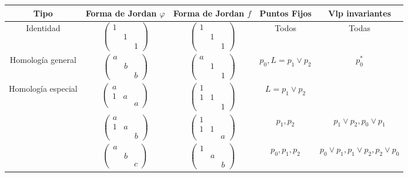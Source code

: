\documentclass[leqno]{article}
\begin{document}
\begin{center}
\begin{tabular}{|c|c|c|c|c|}
\hline
Tipo & Forma de Jordan $\varphi $ & Forma de Jordan $f$ & Puntos Fijos & Vlp invariantes \\
\hline
Identidad & $\begin{pmatrix} 1 & & \\ & 1 & \\ & & 1 \end{pmatrix}$ & $\begin{pmatrix} 1 & & \\ & 1 & \\ & & 1 \end{pmatrix} $ & Todos & Todas \\
	 \hline
Homología general	 & $\begin{pmatrix} a & & \\ & b & \\  & & b \end{pmatrix} $ & $\begin{pmatrix} a & & \\ & 1 & \\  & & 1 \end{pmatrix} $ & $p_0, L = p_1\lor p_2$ & $p_0^*$ \\
	 \hline
Homología especial	 & $\begin{pmatrix} a & & \\ 1 & a & \\  & & a \end{pmatrix} $ & $\begin{pmatrix} 1 & & \\ 1 & 1 & \\  & & 1 \end{pmatrix} $ & $L = p_1\lor p_2$ & \\
\hline
					 & $\begin{pmatrix} a & & \\ 1 & a& \\  & & b \end{pmatrix} $ & $\begin{pmatrix} 1 & & \\ 1 & 1 & \\  & & a \end{pmatrix} $ & $p_1, p_2$ & $p_1\lor p_2, p_0\lor p_1$   \\
\hline
					 &  $\begin{pmatrix} a & & \\  & b & \\  & & c \end{pmatrix} $ & $\begin{pmatrix} 1 & & \\  & a & \\  & & b \end{pmatrix} $ & $p_0, p_1, p_2$ & $p_0\lor p_1, p_1\lor p_2, p_2\lor p_0$ \\

\end{tabular}
\end{center}
\end{document}
